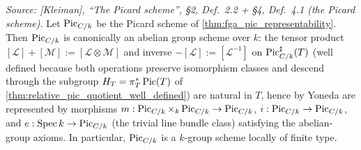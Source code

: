 \begin{theorem}\leanok
  \label{thm:pic_is_group_scheme}

  \textit{Source: [Kleiman], ``The Picard scheme'', \S 2, Def.~2.2 +
  \S 4, Def.~4.1 (the Picard scheme).}
  Let \(\operatorname{Pic}_{C/k}\) be the Picard scheme of
  \cref{thm:fga_pic_representability}. Then \(\operatorname{Pic}_{C/k}\) is canonically an
  abelian group scheme over \(k\): the tensor product
  \([\mathcal{L}] + [\mathcal{M}] := [\mathcal{L} \otimes \mathcal{M}]\)
  and inverse \(-[\mathcal{L}] := [\mathcal{L}^{-1}]\) on
  \(\operatorname{Pic}^\sharp_{C/k}(T)\) (well defined because both operations
  preserve isomorphism classes and descend through the subgroup
  \(H_T = \pi_T^*\operatorname{Pic}(T)\) of \cref{thm:relative_pic_quotient_well_defined})
  are natural in \(T\), hence by Yoneda are represented by morphisms
  \(m : \operatorname{Pic}_{C/k} \times_k \operatorname{Pic}_{C/k} \to \operatorname{Pic}_{C/k}\),
  \(i : \operatorname{Pic}_{C/k} \to \operatorname{Pic}_{C/k}\), and
  \(e : \operatorname{Spec} k \to \operatorname{Pic}_{C/k}\) (the trivial line bundle class) satisfying
  the abelian-group axioms. In particular, \(\operatorname{Pic}_{C/k}\) is a \(k\)-group
  scheme locally of finite type.
\end{theorem}

